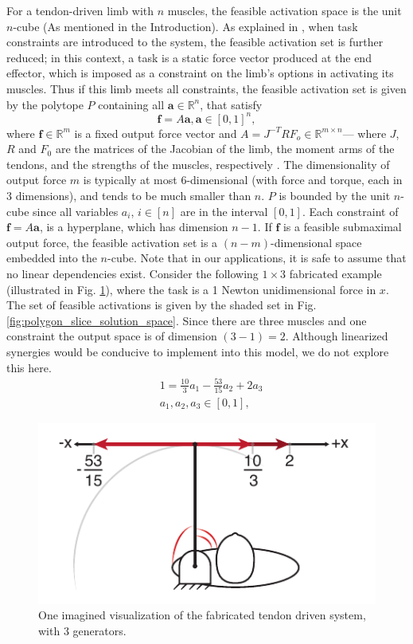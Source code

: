 \label{s:methods}
For a tendon-driven limb with $n$ muscles, the feasible activation space is the unit $n$-cube (As mentioned in the Introduction). As explained in \cite{Valero-Cuevas2009mathematical}, when task constraints are introduced to the system, the feasible activation set is further reduced; in this context, a task is a static force vector produced at the end effector, which is imposed as a constraint on the limb's options in activating its muscles. Thus if this limb meets all constraints, the feasible activation set is given by the polytope $P$ containing all $\textbf{a} \in \mathbb{R}^n$, that satisfy
\[\textbf{f} = A\textbf{a}, \textbf{a} \in [0,1]^n,\]
where $\textbf{f} \in \mathbb{R}^m$ is a fixed output force vector and $A = J^{-T}RF_o \in \mathbb{R}^{m \times n}$--- where $J$, $R$ and $F_0$ are the matrices of the Jacobian of the limb, the moment arms of the tendons, and the strengths of the muscles, respectively \cite{Valero-Cuevas1998Large,Valero-Cuevas2009mathematical}.
The dimensionality of output force $m$ is typically at most 6-dimensional (with force and torque, each in 3 dimensions), and tends to be much smaller than $n$.
$P$ is bounded by the unit $n$-cube since all variables $a_i$, $i \in [n]$ are in the interval $[0,1]$. Each constraint of $\textbf{f}= A \textbf{a}$, is a hyperplane, which has dimension $n-1$.
If $\textbf{f}$ is a feasible submaximal output force, the feasible activation set is a $(n-m)$-dimensional space embedded into the $n$-cube.
Note that in our applications, it is safe to assume that no linear dependencies exist.
Consider the following $1 \times 3$ fabricated example (illustrated in Fig. \ref{fig:schematic_arm}), where the task is a 1 Newton unidimensional force in $x$.
The set of feasible activations is given by the shaded set in Fig. \ref{fig:polygon_slice_solution_space}. Since there are three muscles and one constraint the output space is of dimension $(3-1) = 2$.
Although linearized synergies would be conducive to implement into this model, we do not explore this here.
\begin{align*}
&1 = \frac{10}{3}a_1 - \frac{53}{15}a_2 + 2a_3 \\
&a_1, a_2, a_3 \in [0,1],
\end{align*}

\begin{figure}[h]
  \label{fig:schematic_arm}
  \centering
  \includegraphics{figs/schematic_arm_1D.pdf}
  \caption{One imagined visualization of the fabricated tendon driven system, with 3 generators.}
\end{figure}

